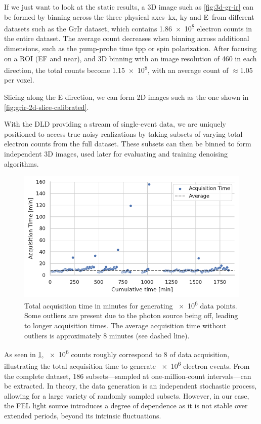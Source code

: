 If we just want to look at the static results, a 3D image such as \cref{fig:3d-gr-ir} can be formed by binning across the three physical axes--\gls{kx}, \gls{ky} and \gls{E}--from different datasets such as the \gls{GrIr} dataset, which contains \num{1.86e8} electron counts in the entire dataset. The average count decreases when binning across additional dimensions, such as the pump-probe time \gls{tpp} or spin polarization. After focusing on a \gls{ROI} (\gls{EF} and near), and 3D binning with an image resolution of \num{460} in each direction, the total counts become \num{1.15e8}, with an average count of $\approx$1.05 per voxel. 

Slicing along the \gls{E} direction, we can form 2D images such as the one shown in \cref{fig:grir-2d-slice-calibrated}.

With the \gls{DLD} providing a stream of single-event data, we are uniquely positioned to access true noisy realizations by taking subsets of varying total electron counts from the full dataset. These subsets can then be binned to form independent 3D images, used later for evaluating and training denoising algorithms.

\begin{figure}
    \centering
    \includegraphics[width=0.8\linewidth]{images/acq_time_1M.pdf}
    \caption{Total acquisition time in minutes for generating \num{e6} data points. Some outliers are present due to the photon source being off, leading to longer acquisition times. The average acquisition time without outliers is approximately 8 minutes (see dashed line).}
    \label{fig:acq-time-1M}
\end{figure}


As seen in \cref{fig:acq-time-1M}, \num{e6} counts roughly correspond to \qty{8}{\min} of data acquisition, illustrating the total acquisition time to generate \num{e6} electron events. From the complete dataset, \num{186} subsets—sampled at one-million-count intervals—can be extracted. In theory, the data generation is an independent stochastic process, allowing for a large variety of randomly sampled subsets. However, in our case, the \gls{FEL} light source introduces a degree of dependence as it is not stable over extended periods, beyond its intrinsic fluctuations.


